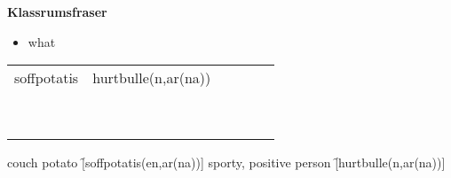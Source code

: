 
\begin{flushleft}
    \textbf{Klassrumsfraser}
    \begin{itemize}
        \item what
    \end{itemize}
\end{flushleft}

\begin{center}
    \begin{tabular}{|c c c c c c|}
        \hline
        soffpotatis & hurtbulle(n,ar(na)) &  &  &  & \\
         &  &  &  &  & \\
         &  &  &  &  & \\
         &  &  &  &  & \\
         &  &  &  &  & \\
         &  &  &  &  & \\
         &  &  &  &  & \\
         &  &  &  &  & \\
         &  &  &  &  & \\
         &  &  &  &  & \\
        \hline
    \end{tabular}
\end{center}

\begin{questions}
    \begin{multicols}{2}
        \raggedcolumns
        \question couch potato \f[soffpotatis(en,ar(na))]
        \question sporty, positive person \f[hurtbulle(n,ar(na))]
    \end{multicols}
\end{questions}

